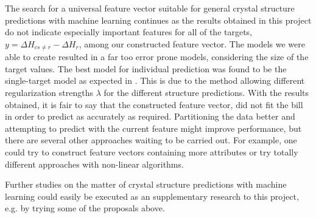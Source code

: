 
\thispagestyle{empty}


The search for a universal feature vector suitable for general crystal structure predictions with machine learning continues as the results obtained in this project do not indicate especially important features for all of the targets, $y=\Delta H_{cs\neq r} - \Delta H_{r}$, among our constructed feature vector. The models we were able to create resulted in a far too error prone models, considering the size of the target values. 
The best model for individual prediction was found to be the single-target model as expected in . This is due to the method allowing different regularization strengths $\lambda$ for the different structure predictions. With the results obtained, it is fair to say that the constructed feature vector, did not fit the bill in order to predict as accurately as required. Partitioning the data better and attempting to predict with the current feature might improve performance, but there are several other approaches waiting to be carried out. For example, one could try to construct feature vectors containing more attributes or try totally different approaches with non-linear algorithms.




Further studies on the matter of crystal structure predictions with machine learning could easily be executed as an supplementary research to this project, e.g. by trying some of the proposals above. 

